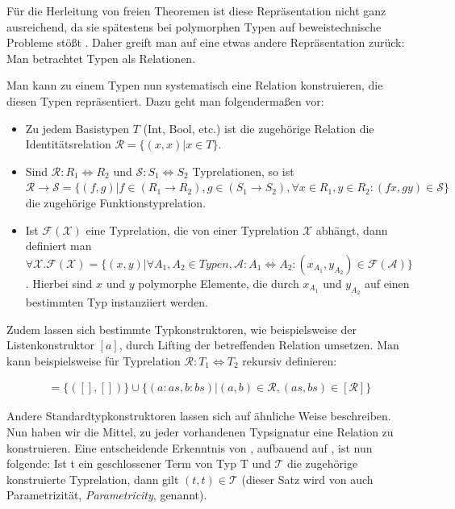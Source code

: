 Für die Herleitung von freien Theoremen ist diese Repräsentation nicht ganz ausreichend, da sie spätestens bei polymorphen
Typen auf beweistechnische Probleme stößt . Daher greift man auf eine etwas andere Repräsentation zurück: Man
betrachtet Typen als Relationen.

Man kann zu einem Typen nun systematisch eine Relation konstruieren, die diesen Typen repräsentiert. Dazu geht man
folgendermaßen vor:

\begin{itemize}
\item Zu jedem Basistypen $T$ (Int, Bool, etc.) ist die zugehörige Relation die Identitätsrelation $\mathcal{R} = \{ (x, x) | x \in T\}$.
\item Sind $\mathcal{R} : R_1 \Leftrightarrow R_2$ und $\mathcal{S} : S_1 \Leftrightarrow S_2$ Typrelationen, so ist $\mathcal{R} \rightarrow \mathcal{S} = \{ (f, g) | f \in (R_1 \rightarrow R_2), g \in (S_1 \rightarrow S_2), \forall x \in R_1, y \in R_2: (f x, g y) \in \mathcal{S} \}$ die zugehörige Funktionstyprelation.
\item Ist $\mathcal{F}(\mathcal{X})$ eine Typrelation, die von einer Typrelation $\mathcal{X}$ abhängt, dann definiert man
$\forall \mathcal{X} . \mathcal{F}(\mathcal{X}) = \{ (x, y) | \forall A_1, A_2 \in Typen, \mathcal{A} : A_1 \Leftrightarrow A_2: 
(x_{A_1}, y_{A_2}) \in \mathcal{F}(\mathcal{A}) \}$. Hierbei sind $x$ und $y$ polymorphe Elemente, die durch $x_{A_1}$ und $y_{A_2}$
auf einen bestimmten Typ instanziiert werden.
\end{itemize}

Zudem lassen sich bestimmte Typkonstruktoren, wie beispielsweise der Listenkonstruktor $[a]$, durch Lifting der betreffenden
Relation umsetzen. Man kann beispielsweise für Typrelation $\mathcal{R} : T_1 \Leftrightarrow T_2$ rekursiv definieren:

\begin{align}
[\mathcal{R}] = \{ ([], []) \} \cup \{ (a : as, b : bs) | (a, b) \in \mathcal{R}, (as, bs) \in [\mathcal{R}] \}
\end{align}

Andere Standardtypkonstruktoren lassen sich auf ähnliche Weise beschreiben. Nun haben wir die Mittel, zu jeder vorhandenen
Typsignatur eine Relation zu konstruieren. Eine entscheidende Erkenntnis von \cite{wadler}, aufbauend auf
\cite{reynolds}, ist nun folgende: Ist t ein geschlossener Term von Typ T und $\mathcal{T}$ die zugehörige konstruierte
Typrelation, dann gilt $(t, t) \in \mathcal{T}$ (dieser Satz wird von \cite{wadler} auch Parametrizität, \textit{Parametricity}, genannt).

